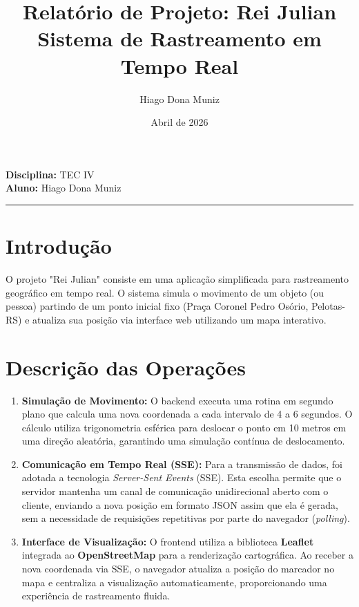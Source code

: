 \documentclass[12pt,a4paper]{article}
\title{Relatório de Projeto: Rei Julian \\ \large Sistema de Rastreamento em Tempo Real}
\author{Hiago Dona Muniz}
\date{Abril de 2026}
\begin{document}
\maketitle

\noindent \textbf{Disciplina:} TEC IV \\
\textbf{Aluno:} Hiago Dona Muniz

\hrule
\vspace{0.5cm}

\section{Introdução}
O projeto "Rei Julian" consiste em uma aplicação simplificada para rastreamento geográfico em tempo real. O sistema simula o movimento de um objeto (ou pessoa) partindo de um ponto inicial fixo (Praça Coronel Pedro Osório, Pelotas-RS) e atualiza sua posição via interface web utilizando um mapa interativo.

\section{Descrição das Operações}

\begin{enumerate}
    \item \textbf{Simulação de Movimento:} O backend executa uma rotina em segundo plano que calcula uma nova coordenada a cada intervalo de 4 a 6 segundos. O cálculo utiliza trigonometria esférica para deslocar o ponto em 10 metros em uma direção aleatória, garantindo uma simulação contínua de deslocamento.
    
    \item \textbf{Comunicação em Tempo Real (SSE):} Para a transmissão de dados, foi adotada a tecnologia \textit{Server-Sent Events} (SSE). Esta escolha permite que o servidor mantenha um canal de comunicação unidirecional aberto com o cliente, enviando a nova posição em formato JSON assim que ela é gerada, sem a necessidade de requisições repetitivas por parte do navegador (\textit{polling}).
    
    \item \textbf{Interface de Visualização:} O frontend utiliza a biblioteca \textbf{Leaflet} integrada ao \textbf{OpenStreetMap} para a renderização cartográfica. Ao receber a nova coordenada via SSE, o navegador atualiza a posição do marcador no mapa e centraliza a visualização automaticamente, proporcionando uma experiência de rastreamento fluida.
\end{enumerate}
\end{document}

